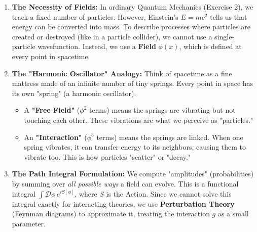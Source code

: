 \begin{enumerate}
    \item \textbf{The Necessity of Fields:} In ordinary Quantum Mechanics (Exercise 2), we track a fixed number of particles. However, Einstein's $E=mc^2$ tells us that energy can be converted into mass. To describe processes where particles are created or destroyed (like in a particle collider), we cannot use a single-particle wavefunction. Instead, we use a \textbf{Field} $\phi(x)$, which is defined at every point in spacetime.
    \item \textbf{The "Harmonic Oscillator" Analogy:} Think of spacetime as a fine mattress made of an infinite number of tiny springs. Every point in space has its own "spring" (a harmonic oscillator). 
    \begin{itemize}
        \item A \textbf{"Free Field"} ($\phi^2$ terms) means the springs are vibrating but not touching each other. These vibrations are what we perceive as "particles."
        \item An \textbf{"Interaction"} ($\phi^3$ terms) means the springs are linked. When one spring vibrates, it can transfer energy to its neighbors, causing them to vibrate too. This is how particles "scatter" or "decay."
    \end{itemize}
    \item \textbf{The Path Integral Formulation:} We compute "amplitudes" (probabilities) by summing over \textit{all possible ways} a field can evolve. This is a functional integral $\int \mathcal{D}\phi \, e^{iS[\phi]}$, where $S$ is the Action. Since we cannot solve this integral exactly for interacting theories, we use \textbf{Perturbation Theory} (Feynman diagrams) to approximate it, treating the interaction $g$ as a small parameter.
\end{enumerate}

